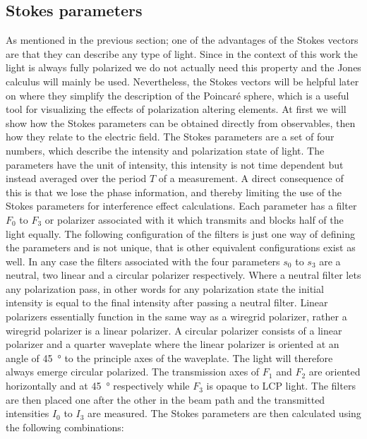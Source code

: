 \subsection{Stokes parameters}
\label{sec:stokes_parameters}
As mentioned in the previous section; one of the advantages of the Stokes vectors are that they can describe any type of light. Since in the context of this work the light is always fully polarized we do not actually need this property and the Jones calculus will mainly be used. Nevertheless, the Stokes vectors will be helpful later on where they simplify the description of the Poincaré sphere, which is a useful tool for visualizing the effects of polarization altering elements. At first we will show how the Stokes parameters can be obtained directly from observables, then how they relate to the electric field. The Stokes parameters are a set of four numbers, which describe the intensity and polarization state of light. The parameters have the unit of intensity, this intensity is not time dependent but instead averaged over the period $T$ of a measurement. A direct consequence of this is that we lose the phase information, and thereby limiting the use of the Stokes parameters for interference effect calculations. Each parameter has a filter $F_0$ to $F_3$ or polarizer associated with it which transmits and blocks half of the light equally. The following configuration of the filters is just one way of defining the parameters and is not unique, that is other equivalent configurations exist as well. In any case the filters associated with the four parameters $s_0$ to $s_3$ are a neutral, two linear and a circular polarizer respectively. Where a neutral filter lets any polarization pass, in other words for any polarization state the initial intensity is equal to the final intensity after passing a neutral filter. Linear polarizers essentially function in the same way as a wiregrid polarizer, rather a wiregrid polarizer is a linear polarizer. A circular polarizer consists of a linear polarizer and a quarter waveplate where the linear polarizer is oriented at an angle of \SI{45}{\degree} to the principle axes of the waveplate. The light will therefore always emerge circular polarized. The transmission axes of $F_1$ and $F_2$ are oriented horizontally and at \SI{45}{\degree} respectively while $F_3$ is opaque to LCP light. The filters are then placed one after the other in the beam path and the transmitted intensities $I_0$ to $I_3$ are measured. The Stokes parameters are then calculated using the following combinations:


